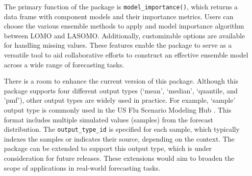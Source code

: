 \documentclass[
  article,
  shortnames,
  notitle]{jss}
\begin{document}
The primary function of the package is \texttt{model\_importance()},
which returns a data frame with component models and their importance
metrics. Users can choose the various ensemble methods to apply and
model importance algorithm between LOMO and LASOMO. Additionally,
customizable options are available for handling missing values. These
features enable the package to serve as a versatile tool to aid
collaborative efforts to construct an effective ensemble model across a
wide range of forecasting tasks.

There is a room to enhance the current version of this package. Although
this package supports four different output types (`mean', `median',
`quantile, and 'pmf'), other output types are widely used in practice.
For example, `sample' output type is commonly used in the US Flu
Scenario Modeling Hub \citep{FluSMH}. This format includes multiple
simulated values (samples) from the forecast distribution. The
\texttt{output\_type\_id} is specified for each sample, which typically
indexes the samples or indicates their source, depending on the context.
The package can be extended to support this output type, which is under
consideration for future releases. These extensions would aim to broaden
the scope of applications in real-world forecasting tasks.


  
\end{document}
